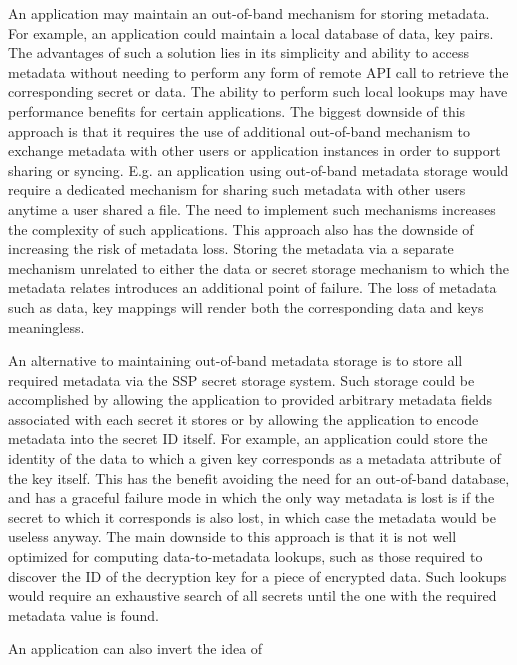 \begin{packed_desc}
\item[Out-of-Band Metadata:] An application may maintain an
  out-of-band mechanism for storing metadata. For example, an
  application could maintain a local database of data, key pairs. The
  advantages of such a solution lies in its simplicity and ability to
  access metadata without needing to perform any form of remote API
  call to retrieve the corresponding secret or data. The ability to
  perform such local lookups may have performance benefits for certain
  applications. The biggest downside of this approach is that it
  requires the use of additional out-of-band mechanism to exchange
  metadata with other users or application instances in order to
  support sharing or syncing. E.g. an application using out-of-band
  metadata storage would require a dedicated mechanism for sharing
  such metadata with other users anytime a user shared a file. The
  need to implement such mechanisms increases the complexity of such
  applications. This approach also has the downside of increasing the
  risk of metadata loss. Storing the metadata via a separate mechanism
  unrelated to either the data or secret storage mechanism to which
  the metadata relates introduces an additional point of failure.  The
  loss of metadata such as data, key mappings will render both the
  corresponding data and keys meaningless.
\item[Key-Tied Metadata:] An alternative to maintaining out-of-band
  metadata storage is to store all required metadata via the SSP
  secret storage system. Such storage could be accomplished by
  allowing the application to provided arbitrary metadata fields
  associated with each secret it stores or by allowing the application
  to encode metadata into the secret ID itself. For example, an
  application could store the identity of the data to which a given
  key corresponds as a metadata attribute of the key itself. This has
  the benefit avoiding the need for an out-of-band database, and has a
  graceful failure mode in which the only way metadata is lost is if
  the secret to which it corresponds is also lost, in which case the
  metadata would be useless anyway. The main downside to this approach
  is that it is not well optimized for computing data-to-metadata
  lookups, such as those required to discover the ID of the decryption
  key for a piece of encrypted data. Such lookups would require an
  exhaustive search of all secrets until the one with the required
  metadata value is found.
\item[Data-Tied Metadata:] An application can also invert the idea of

\end{packed_desc}

